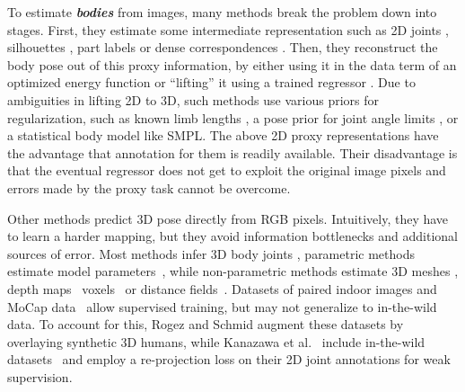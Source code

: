 \documentclass[runningheads]{llncs}
\newcommand{\smpl}{\mbox{SMPL}\xspace}
\newcommand{\mocap}{\mbox{MoCap}\xspace}
\newcommand{\inthewild}{\mbox{in-the-wild}\xspace}
\newcommand{\twoD}{2D\xspace}
\newcommand{\threeD}{3D\xspace}
\newcommand{\etal}{et al.\xspace}
\newcommand{\rgb}{\mbox{RGB}\xspace}
\newcommand{\labelBODY}[1]{\xspace{\color{black} \textbf{\emph{#1}}}\xspace}
\begin{document}
To estimate \labelBODY{bodies} from images, many methods break the
problem down into stages.
First, they estimate some intermediate representation such as
\twoD joints \cite{bogo2016keep,grauman2003inferring,guan_iccv_scape_2009,MuVS_3DV_2017,kanazawa_cvpr_2018,martinez_2017_3dbaseline,pavlakos2018learning,sigal2006predicting,tome2017lifting,zhao_2019_cvpr_semgcn},
silhouettes \cite{agarwal_trigs_3d_poses,MuVS_3DV_2017,pavlakos2018learning}, part labels \cite{omran2018neural,Ruegg:AAAI:2020} or dense correspondences \cite{Guler_densepose,yu_iccv2019_hybrid}.
Then, they reconstruct the body pose out of this proxy information, by either using it in the data term of an optimized energy function \cite{bogo2016keep,MuVS_3DV_2017,zanfir_2018_cvpr} or
``lifting'' it using a trained regressor \cite{kanazawa_cvpr_2018,martinez_2017_3dbaseline,omran2018neural,pavlakos2018learning,tome2017lifting}.
Due to ambiguities in lifting \twoD to \threeD, such methods use various priors for regularization,
such as known limb lengths \cite{lee1985determination}, a pose prior for joint angle limits \cite{akhter2015pose},
or a statistical body model \cite{bogo2016keep,MuVS_3DV_2017,omran2018neural,pavlakos2018learning} like \smpl \cite{SMPL:2015}.
The above \twoD proxy representations have the advantage that
annotation for them is readily available.
Their disadvantage is that the eventual regressor does not get to exploit the
original image pixels and errors made by the proxy task cannot be overcome.

Other methods predict \threeD pose directly from \rgb pixels.
Intuitively, they have to learn a harder mapping, but they avoid information bottlenecks and additional sources of error.
Most methods infer \threeD body joints \cite{li2015maximum,pavlakos2017coarse,sun2017compositional,sun2018integral,bugra_bmvc_2016},
parametric methods estimate model parameters~\cite{kanazawa_cvpr_2018,kanazawa_2019_cvpr,Kolotouros_2019_ICCV},
while non-parametric methods estimate \threeD meshes
\cite{kolotouros2019convolutional},
depth maps~\cite{Gabeur_2019_ICCV,Smith_2019_ICCV}
voxels~\cite{varol2018bodynet,Zheng_2019_ICCV} or distance
fields~\cite{Saito_2019_ICCV,Saito_2020_CVPR}.
Datasets of paired indoor images and \mocap data~\cite{ionescupapavaetal2014,sigal_ijcv_10b} allow supervised training,
but may not generalize to \inthewild data.
To account for this, Rogez and Schmid \cite{rogez2016mocap} augment these datasets by overlaying synthetic \threeD humans, while
Kanazawa \etal~\cite{kanazawa_cvpr_2018} include \inthewild datasets~\cite{andriluka20142d,johnson2010clustered,johnson2011learning,lin2014microsoft}
and employ a \mbox{re-projection} loss on their \twoD joint annotations for weak supervision.
\end{document}
